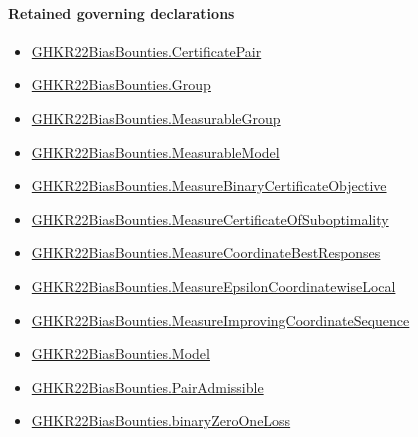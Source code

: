 \documentclass[10pt]{article}
\begin{document}
\paragraph{Retained governing declarations}
\begin{itemize}\raggedright
\item \hyperlink{governing-declaration-b396fb14c5f379fe}{GHKR22\allowbreak{}Bias\allowbreak{}Bounties.\allowbreak{}Certificate\allowbreak{}Pair}
\item \hyperlink{paper-prerequisite-cc7214115b27106f}{GHKR22\allowbreak{}Bias\allowbreak{}Bounties.\allowbreak{}Group}
\item \hyperlink{governing-declaration-8d5012d60e076f7c}{GHKR22\allowbreak{}Bias\allowbreak{}Bounties.\allowbreak{}Measurable\allowbreak{}Group}
\item \hyperlink{governing-declaration-8b721c00962c326a}{GHKR22\allowbreak{}Bias\allowbreak{}Bounties.\allowbreak{}Measurable\allowbreak{}Model}
\item \hyperlink{governing-declaration-d01ac455a50eb103}{GHKR22\allowbreak{}Bias\allowbreak{}Bounties.\allowbreak{}Measure\allowbreak{}Binary\allowbreak{}Certificate\allowbreak{}Objective}
\item \hyperlink{paper-prerequisite-ad05480b2c897936}{GHKR22\allowbreak{}Bias\allowbreak{}Bounties.\allowbreak{}Measure\allowbreak{}Certificate\allowbreak{}Of\allowbreak{}Suboptimality}
\item \hyperlink{governing-declaration-84d84e83239c6aed}{GHKR22\allowbreak{}Bias\allowbreak{}Bounties.\allowbreak{}Measure\allowbreak{}Coordinate\allowbreak{}Best\allowbreak{}Responses}
\item \hyperlink{governing-declaration-4ec0d0414ed5f6b0}{GHKR22\allowbreak{}Bias\allowbreak{}Bounties.\allowbreak{}Measure\allowbreak{}Epsilon\allowbreak{}Coordinatewise\allowbreak{}Local}
\item \hyperlink{governing-declaration-b55e5f8b223b51e3}{GHKR22\allowbreak{}Bias\allowbreak{}Bounties.\allowbreak{}Measure\allowbreak{}Improving\allowbreak{}Coordinate\allowbreak{}Sequence}
\item \hyperlink{paper-prerequisite-333127605c12eba8}{GHKR22\allowbreak{}Bias\allowbreak{}Bounties.\allowbreak{}Model}
\item \hyperlink{governing-declaration-99b7d1a023f99cb3}{GHKR22\allowbreak{}Bias\allowbreak{}Bounties.\allowbreak{}Pair\allowbreak{}Admissible}
\item \hyperlink{governing-declaration-78e8cb53fdc44c21}{GHKR22\allowbreak{}Bias\allowbreak{}Bounties.\allowbreak{}binary\allowbreak{}Zero\allowbreak{}One\allowbreak{}Loss}

\end{itemize}
\end{document}
